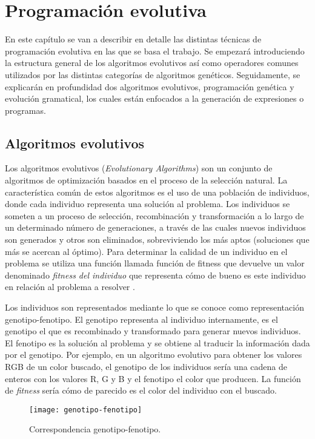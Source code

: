 \chapter{Programación evolutiva} \label{cap:prog_evol}
En este capítulo se van a describir en detalle las distintas técnicas de programación evolutiva en las que se basa el trabajo. Se empezará introduciendo la estructura general de los algoritmos evolutivos así como operadores comunes utilizados por las distintas categorías de algoritmos genéticos. Seguidamente, se explicarán en profundidad dos algoritmos evolutivos, programación genética y evolución gramatical, los cuales están enfocados a la generación de expresiones o programas.

\section{Algoritmos evolutivos}
Los algoritmos evolutivos (\textit{Evolutionary Algorithms}) son un conjunto de algoritmos de optimización basados en el proceso de la selección natural. La característica común de estos algoritmos es el uso de una población de individuos, donde cada individuo representa una solución al problema. Los individuos se someten a un proceso de selección, recombinación y transformación a lo largo de un determinado número de generaciones, a través de las cuales nuevos individuos son generados y otros son eliminados, sobreviviendo los más aptos (soluciones que más se acercan al óptimo). Para determinar la calidad de un individuo en el problema se utiliza una función llamada función de fitness que devuelve un valor denominado \textit{fitness del individuo} que representa cómo de bueno es este individuo en relación al problema a resolver \cite{cervigon09}.

Los individuos son representados mediante lo que se conoce como representación genotipo-fenotipo. El genotipo representa al individuo internamente, es el genotipo el que es recombinado y transformado para generar nuevos individuos. El fenotipo es la solución al problema y se obtiene al traducir la información dada por el genotipo. Por ejemplo, en un algoritmo evolutivo para obtener los valores RGB de un color buscado, el genotipo de los individuos sería una cadena de enteros con los valores R, G y B y el fenotipo el color que producen. La función de \textit{fitness} sería cómo de parecido es el color del individuo con el buscado.
\begin{figure}[H]
\centering
\texttt{[image: genotipo-fenotipo]}
\caption{Correspondencia genotipo-fenotipo.}
\end{figure}

